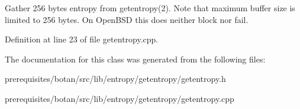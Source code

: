 Gather 256 bytes entropy from getentropy(2). Note that maximum buffer size is limited to 256 bytes. On Open\+B\+SD this does neither block nor fail. 

Definition at line 23 of file getentropy.\+cpp.



The documentation for this class was generated from the following files\+:\begin{DoxyCompactItemize}
\item 
prerequisites/botan/src/lib/entropy/getentropy/getentropy.\+h\item 
prerequisites/botan/src/lib/entropy/getentropy/getentropy.\+cpp\end{DoxyCompactItemize}
